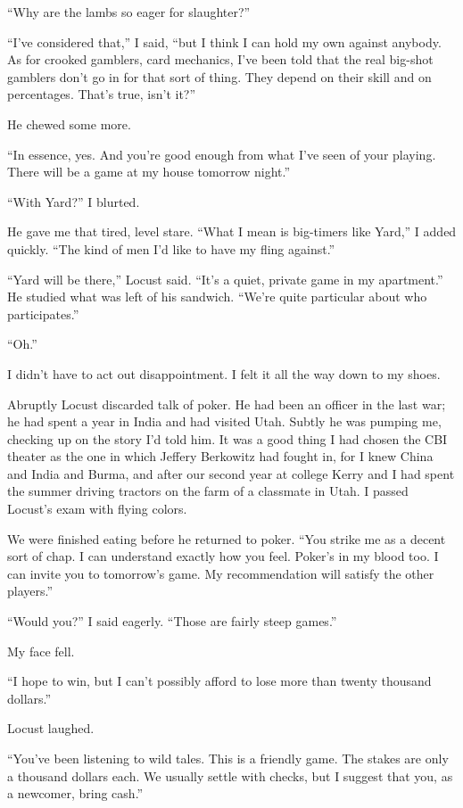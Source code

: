 \documentclass{novel}
\begin{document}
“Why are the lambs so eager for slaughter?”

“I’ve considered that,” I said, “but I think I can hold my own against anybody. As for crooked gamblers, card mechanics, I’ve been told that the real big-shot gamblers don’t go in for that sort of thing. They depend on their skill and on percentages. That’s true, isn’t it?”

\scenestars

He chewed some more.

“In essence, yes. And you’re good enough from what I’ve seen of your playing. There will be a game at my house tomorrow night.”

“With Yard?” I blurted.

He gave me that tired, level stare. “What I mean is big-timers like Yard,” I added quickly. “The kind of men I’d like to have my fling against.”

“Yard will be there,” Locust said. “It’s a quiet, private game in my apartment.” He studied what was left of his sandwich. “We’re quite particular about who participates.”

“Oh.”

I didn’t have to act out disappointment. I felt it all the way down to my shoes.

Abruptly Locust discarded talk of poker. He had been an officer in the last war; he had spent a year in India and had visited Utah. Subtly he was pumping me, checking up on the story I’d told him. It was a good thing I had chosen the CBI theater as the one in which Jeffery Berkowitz had fought in, for I knew China and India and Burma, and after our second year at college Kerry and I had spent the summer driving tractors on the farm of a classmate in Utah. I passed Locust’s exam with flying colors.

We were finished eating before he returned to poker. “You strike me as a decent sort of chap. I can understand exactly how you feel. Poker’s in my blood too. I can invite you to tomorrow’s game. My recommendation will satisfy the other players.”

“Would you?” I said eagerly. “Those are fairly steep games.”

My face fell.

“I hope to win, but I can’t possibly afford to lose more than twenty thousand dollars.”

Locust laughed.

“You’ve been listening to wild tales. This is a friendly game. The stakes are only a thousand dollars each. We usually settle with checks, but I suggest that you, as a newcomer, bring cash.”
\end{document}

